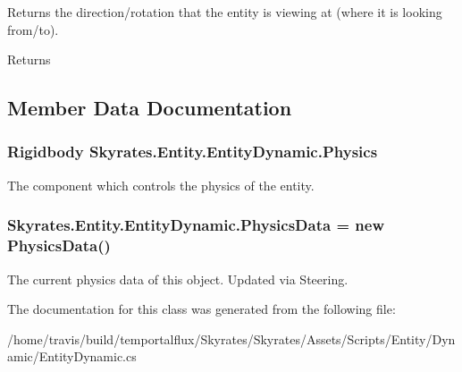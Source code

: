 Returns the direction/rotation that the entity is viewing at (where it is looking from/to). 

\begin{DoxyReturn}{Returns}

\end{DoxyReturn}


\subsection{Member Data Documentation}
\hypertarget{class_skyrates_1_1_entity_1_1_entity_dynamic_af5b8ec5d728a356e1216f9eaca0e6bdc}{
\subsubsection[{Physics}]{\setlength{\rightskip}{0pt plus 5cm}Rigidbody Skyrates.\-Entity.\-Entity\-Dynamic.\-Physics\hspace{0.3cm}{\ttfamily [protected]}}}\label{class_skyrates_1_1_entity_1_1_entity_dynamic_af5b8ec5d728a356e1216f9eaca0e6bdc}


The component which controls the physics of the entity. 

\hypertarget{class_skyrates_1_1_entity_1_1_entity_dynamic_ad02fdf789b5c8db16054651b9ff54bff}{
\subsubsection[{Physics\-Data}]{ Skyrates.\-Entity.\-Entity\-Dynamic.\-Physics\-Data = new {\bf Physics\-Data}()}}\label{class_skyrates_1_1_entity_1_1_entity_dynamic_ad02fdf789b5c8db16054651b9ff54bff}


The current physics data of this object. Updated via Steering. 



The documentation for this class was generated from the following file\-:\begin{DoxyCompactItemize}
\item 
/home/travis/build/temportalflux/\-Skyrates/\-Skyrates/\-Assets/\-Scripts/\-Entity/\-Dynamic/Entity\-Dynamic.\-cs\end{DoxyCompactItemize}
